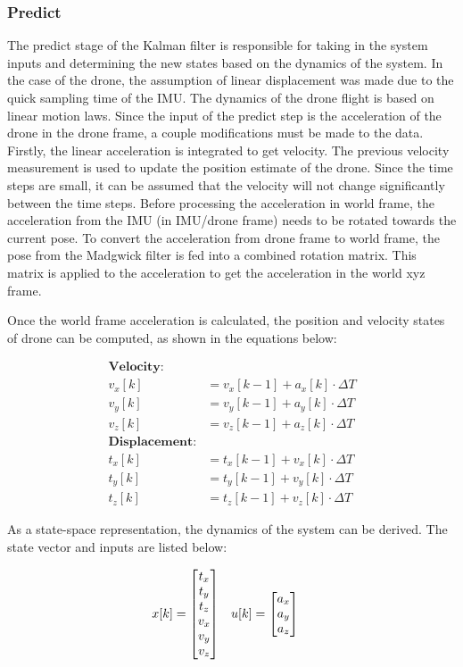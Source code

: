 \documentclass[bare_jrnl_transmag]{subfiles}
\begin{document}
 

\subsubsection{Predict}
The predict stage of the Kalman filter is responsible for taking in the system inputs and determining the new states based on the dynamics of the system. In the case of the drone, the assumption of linear displacement was made due to the quick sampling time of the IMU. The dynamics of the drone flight is based on linear motion laws. Since the input of the predict step is the acceleration of the drone in the drone frame, a couple modifications must be made to the data. Firstly, the linear acceleration is integrated to get velocity. The previous velocity measurement is used to update the position estimate of the drone. Since the time steps are small, it can be assumed that the velocity will not change significantly between the time steps. 
Before processing the acceleration in world frame, the acceleration from the IMU (in IMU/drone frame) needs to be rotated towards the current pose. To convert the acceleration from drone frame to world frame, the pose from the Madgwick filter is fed into a combined rotation matrix. This matrix is applied to the acceleration to get the acceleration in the world xyz frame. \newline

Once the world frame acceleration is calculated, the position and velocity states of drone can be computed, as shown in the equations below:

\begin{align*}
    \textbf{Velocity:} \\
    v_x[k] &= v_x[k-1] + a_x[k] \cdot \Delta T \\
    v_y[k] &= v_y[k-1] + a_y[k] \cdot \Delta T \\
    v_z[k] &= v_z[k-1] + a_z[k] \cdot \Delta T
\\
    \textbf{Displacement:} \\
    t_x[k] &= t_x[k-1] + v_x[k] \cdot \Delta T \\
    t_y[k] &= t_y[k-1] + v_y[k] \cdot \Delta T \\
    t_z[k] &= t_z[k-1] + v_z[k] \cdot \Delta T
\end{align*}
    
As a state-space representation, the dynamics of the system can be derived. The state vector and inputs are listed below:

\begin{align*}
    x[k] &= {\null\hbox{$\begin{bmatrix}
    t_x \\
    t_y \\
    t_z \\
    v_x \\
    v_y \\
    v_z
    \end{bmatrix}$}}
    \quad
    u[k] = {\null\hbox{$\begin{bmatrix}
    a_x \\
    a_y \\
    a_z
    \end{bmatrix}$}}
\end{align*}
\end{document}
